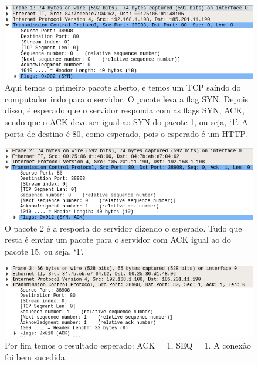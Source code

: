 \documentclass{article}
\begin{document}
\begin{figure}[h]
    \centering
    \includegraphics[width=\textwidth]{images/conect3.png}
    \caption{Aqui temos o primeiro pacote aberto, e temos um TCP saíndo do computador indo para o servidor. O pacote leva a flag SYN. Depois disso, é esperado que o servidor responda com as flags SYN, ACK, sendo que o ACK deve ser igual ao SYN do pacote 1, ou seja, `1'. A porta de destino é 80, como esperado, pois o esperado é um HTTP.}
    \label{fig:conect3}
\end{figure}{}

\begin{figure}[h]
    \centering
    \includegraphics[width=\textwidth]{images/conect4.png}
    \caption{O pacote 2 é a resposta do servidor dizendo o esperado. Tudo que resta é enviar um pacote para o servidor com ACK igual ao do pacote 15, ou seja, `1'.}
    \label{fig:conect4}
\end{figure}{}

\begin{figure}[h]
    \centering
    \includegraphics[width=\textwidth]{images/conect5.png}
    \caption{Por fim temos o resultado esperado: ACK = 1, SEQ = 1. A conexão foi bem sucedida.}
    \label{fig:conect5}
\end{figure}{}

\newpage
\end{document}
